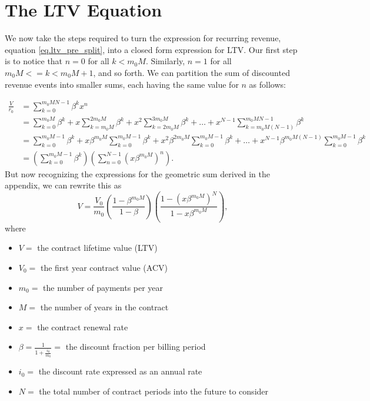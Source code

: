 \documentclass[paper=a4, fontsize=11pt abstract]{scrartcl}
\numberwithin{equation}{section}		%
\numberwithin{figure}{section}			%
\numberwithin{table}{section}				%
\begin{document}
\section{The LTV Equation}
We now take the steps required to turn the expression for recurring revenue, equation \ref{eq.ltv_pre_split}, into a closed form expression for LTV.  Our first step is to notice that $n=0$ for all $k < m_0 M$.  Similarly, $n=1$ for all $m_0 M <= k < m_0 M +1$, and so forth.  We can partition the sum of discounted revenue events into smaller sums, each having the same value for $n$ as follows:

\begin{align} \nonumber
    \frac{V}{r_0} &= \sum_{k=0}^{m_0 M N - 1} \beta^k x^n \\ \nonumber
    &= \sum_{k=0}^{m_0 M } \beta^k 
    + x \sum_{k=m_0 M}^{2 m_0 M } \beta^k 
    + x^2 \sum_{k=2 m_0 M}^{3 m_0 M } \beta^k 
    + \dots
    + x^{N - 1} \sum_{k=m_0 M \left(N-1\right)}^{m_0 M N - 1} \beta^k \\ \nonumber
    &= \sum_{k=0}^{m_0 M -1} \beta^k 
    + x \beta^{m_0M}\sum_{k=0}^{m_0 M-1 } \beta^k 
    + x^2 \beta^{2 m_0M}\sum_{k=0}^{m_0 M -1} \beta^k 
    + \dots
    + x^{N - 1} \beta^{m_0M (N-1)}\sum_{k=0}^{m_0 M -1} \beta^k \\ \nonumber
    &= \left(\sum_{k=0}^{m_0 M - 1} \beta^k\right)\left(\sum_{n=0}^{N-1} \left(x \beta ^{m_0 M}\right)^n\right).
\end{align}
But now recognizing the expressions for the geometric sum derived in the appendix, we can rewrite this as
\begin{equation}
    V = \frac{V_0}{m_0}
    \left(\frac{1 - \beta^{m_0 M}}{1 - \beta}\right)
    \left(\frac{1-\left(x \beta^{m_0 M}\right)^N}{1 - x \beta^{m_0 M}}\right),
\end{equation}  \label{eq.ltv_closed_from}
where
\begin{itemize}
    \item $V=$ the contract lifetime value (LTV)
    \item $V_0=$ the first year contract value (ACV)
    \item $m_0=$ the number of payments per year
    \item $M=$ the number of years in the contract
    \item $x=$ the contract renewal rate
    \item $\beta=\frac{1}{1 + \frac{i_0}{m_0}}=$ the discount fraction per billing period
    \item $i_0=$ the discount rate expressed as an annual rate
    \item $N=$ the total number of contract periods into the future to consider
\end{itemize}
\end{document}
